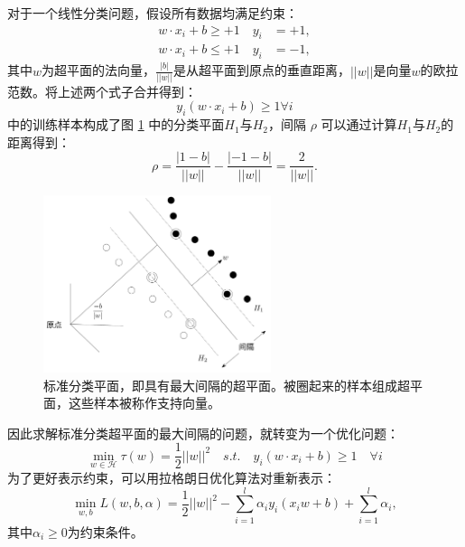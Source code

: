 对于一个线性分类问题，假设所有数据均满足约束：
\begin{equation}
\begin{array}{cc}
	w\cdot x_i +b \geq + 1 \quad y_i &= +1, \\
	w\cdot x_i +b \leq + 1 \quad y_i &= -1,
	\label{equ:constraint}
\end{array}
\end{equation}
其中$w$为超平面的法向量，$\frac{|b|}{||w||}$是从超平面到原点的垂直距离，$||w||$是向量$w$的欧拉范数。将上述两个式子合并得到：
\begin{equation}
	y_i(w\cdot x_i+b)\geq 1 \forall i
	\label{equ:svm}
\end{equation}
 中的训练样本构成了图 \ref{fig:hyperplanes} 中的分类平面$H_1$与$H_2$，间隔 $\rho$ 可以通过计算$H_1$与$H_2$的距离得到：
\begin{equation}
	\rho=\frac{|1-b|}{||w||}-\frac{|-1-b|}{||w||}=\frac{2}{||w||}.
\end{equation}
\begin{figure}[hbt]
	\centering
	\includegraphics[width=6.67cm]{figures/emitter/svm_hard}
	\caption{标准分类平面，即具有最大间隔的超平面。被圈起来的样本组成超平面，这些样本被称作支持向量。}
	\label{fig:hyperplanes}
\end{figure}
因此求解标准分类超平面的最大间隔的问题，就转变为一个优化问题：
\begin{equation}
	\min \limits_{w\in \mathcal{H}} \tau(w)=\frac{1}{2}||w||^2\quad s.t. \quad y_i(w\cdot x_i +b) \geq 1 \quad \forall i
	\label{equ:optimization}
\end{equation}
为了更好表示约束，可以用拉格朗日优化算法对重新表示：
\begin{equation}
	\min \limits_{w,b} L(w,b,\alpha)=\frac{1}{2}||w||^2-\sum_{i=1}^l\alpha_i y_i (x_i w + b) + \sum_{i=1}^l{\alpha_i},
	\label{equ:lagrange}
\end{equation}
其中$\alpha_i \geq 0$为约束条件。

